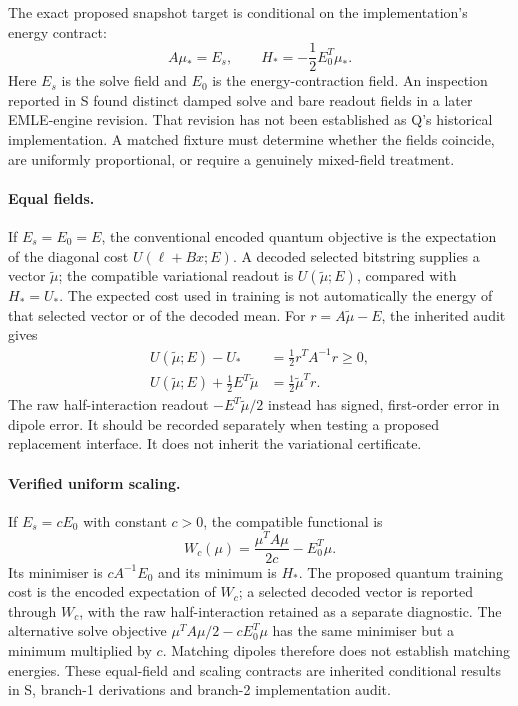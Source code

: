 \documentclass{article}
\begin{document}
The exact proposed snapshot target is conditional on the implementation's energy contract:
\begin{equation}
A\mu_*=E_s,\qquad H_*=-\frac12E_0^T\mu_*.
\end{equation}
Here $E_s$ is the solve field and $E_0$ is the energy-contraction field. An inspection reported in S found distinct damped solve and bare readout fields in a later EMLE-engine revision. That revision has not been established as Q's historical implementation. A matched fixture must determine whether the fields coincide, are uniformly proportional, or require a genuinely mixed-field treatment.

\paragraph{Equal fields.}
If $E_s=E_0=E$, the conventional encoded quantum objective is the expectation of the diagonal cost $U(\ell+Bx;E)$. A decoded selected bitstring supplies a vector $\tilde\mu$; the compatible variational readout is $U(\tilde\mu;E)$, compared with $H_*=U_*$. The expected cost used in training is not automatically the energy of that selected vector or of the decoded mean. For $r=A\tilde\mu-E$, the inherited audit gives
\begin{align}
U(\tilde\mu;E)-U_*&=\frac12r^TA^{-1}r\geq0,\\
U(\tilde\mu;E)+\frac12E^T\tilde\mu&=\frac12\tilde\mu^Tr.
\end{align}
The raw half-interaction readout $-E^T\tilde\mu/2$ instead has signed, first-order error in dipole error. It should be recorded separately when testing a proposed replacement interface. It does not inherit the variational certificate.

\paragraph{Verified uniform scaling.}
If $E_s=cE_0$ with constant $c>0$, the compatible functional is
\begin{equation}
W_c(\mu)=\frac{\mu^TA\mu}{2c}-E_0^T\mu.
\end{equation}
Its minimiser is $cA^{-1}E_0$ and its minimum is $H_*$. The proposed quantum training cost is the encoded expectation of $W_c$; a selected decoded vector is reported through $W_c$, with the raw half-interaction retained as a separate diagnostic. The alternative solve objective $\mu^TA\mu/2-cE_0^T\mu$ has the same minimiser but a minimum multiplied by $c$. Matching dipoles therefore does not establish matching energies. These equal-field and scaling contracts are inherited conditional results in S, branch-1 derivations and branch-2 implementation audit.
\end{document}
